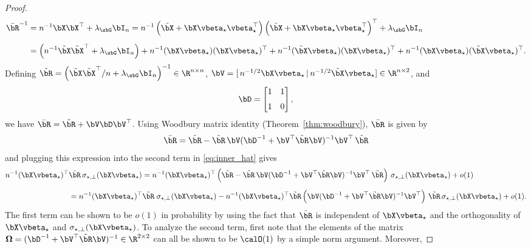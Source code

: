 \begin{proof}
    \begin{align*}
        \bar\bR^{-1} &= n^{-1}  \bX \bX^\top + \lambda_\sbG \bI_n = n^{-1} \left(\tilde\bX + \bX \vbeta_\star \vbeta_\star^\top\right)\left(\tilde\bX + \bX \vbeta_\star \vbeta_\star^\top\right)^\top + \lambda_\sbG \bI_n\\[0.2cm]
        &= \left(n^{-1} \tilde\bX \tilde\bX^\top + \lambda_\sbG \bI_n\right) + n^{-1} (\bX\vbeta_\star)(\bX\vbeta_\star)^\top + n^{-1}(\tilde \bX\vbeta_\star)(\bX\vbeta_\star)^\top + n^{-1}( \bX\vbeta_\star)(\tilde \bX\vbeta_\star)^\top.
    \end{align*}
    Defining $\tilde\bR =\left( \tilde\bX \tilde\bX^\top/n + \lambda_\sbG \bI_n\right)^{-1} \in \R^{n \times n}$,  $\bV = [\,n^{-1/2}\bX\vbeta_\star\, |\, n^{-1/2} \tilde\bX \vbeta_\star] \in \R^{n \times 2}$, and 
    \begin{align*}
        \bD = \begin{bmatrix}
            1 & 1 \\[0.2cm]
            1 & 0
        \end{bmatrix},
    \end{align*}
    we have $\bar\bR = \tilde\bR + \bV \bD \bV^\top$. Using Woodbury matrix identity (Theorem~\ref{thm:woodbury}), $\bar\bR$ is given by
    \begin{align}
        \label{eq:woodbury}
        \bar\bR = \tilde\bR - \tilde\bR\,  \bV (\bD^{-1} + \bV^\top \tilde\bR\bV)^{-1}  \bV^\top\,\tilde\bR
    \end{align}
    and plugging this expression into the second term in \eqref{eq:inner_hat} gives
    \begin{align*}
         n^{-1} (\bX\vbeta_\star)^\top &\bar\bR\, \sigma_{\star, \perp}(\bX\vbeta_\star) = n^{-1} (\bX\vbeta_\star)^\top\left(\tilde\bR - \tilde\bR\,  \bV (\bD^{-1} + \bV^\top \tilde\bR\bV)^{-1}  \bV^\top\,\tilde\bR\right)\,\sigma_{\star, \perp}(\bX\vbeta_{\star}) + o(1)\\[0.2cm]
        &= n^{-1}(\bX\vbeta_\star)^\top \tilde\bR\; \sigma_{\star, \perp}(\bX\vbeta_{\star})  - n^{-1} (\bX\vbeta_\star)^\top\tilde\bR\left(\bV (\bD^{-1} + \bV^\top \tilde\bR\bV)^{-1}  \bV^\top\right)\,\tilde\bR\,\sigma_{\star, \perp}(\bX\vbeta_{\star}) + o(1).
    \end{align*}
    The first term can be shown to be $o(1)$ in probability by using  the fact that $\tilde\bR$ is independent of $\bX\vbeta_\star$ and the orthogonality of $\bX\vbeta_\star$ and $\sigma_{\star, \perp}(\bX\vbeta_\star)$. To analyze the second term, first note that the elements of the matrix $\boldsymbol{\Omega} = (\bD^{-1} + \bV^\top \tilde\bR\bV)^{-1} \in \R^{2 \times 2}$ can all be shown to be $\calO(1)$ by a simple norm argument. Moreover,

\end{proof}
